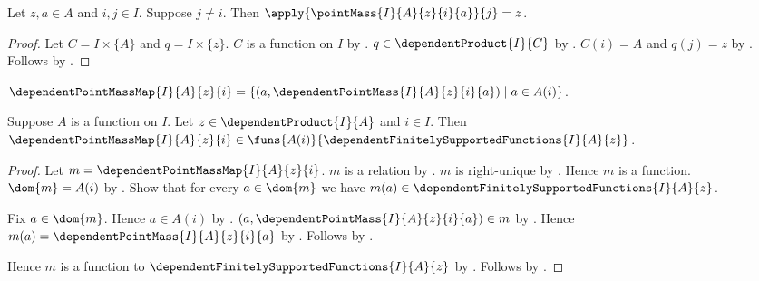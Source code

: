 \begin{proposition}\label{spike_point_mass_other}
    Let $z,a\in A$ and $i,j\in I$.
    Suppose $j\neq i$.
    Then $\apply{\pointMass{I}{A}{z}{i}{a}}{j}=z$.
\end{proposition}
\begin{proof}
    Let $C=I\times\{A\}$ and $q=I\times\{z\}$.
    $C$ is a function on $I$ by
        .
    $q\in\dependentProduct{I}{C}$ by
        .
    $C(i)=A$ and $q(j)=z$ by
        .
    Follows by
        .
\end{proof}

\begin{definition}\label{spike_dependent_point_mass_map}
    $\dependentPointMassMap{I}{A}{z}{i}
        =\{(a,\dependentPointMass{I}{A}{z}{i}{a})\mid a\in A(i)\}$.
\end{definition}

\begin{proposition}\label{spike_dependent_point_mass_map_type}
    Suppose $A$ is a function on $I$.
    Let $z\in\dependentProduct{I}{A}$ and $i\in I$.
    Then
        $\dependentPointMassMap{I}{A}{z}{i}
            \in\funs{A(i)}{
                \dependentFinitelySupportedFunctions{I}{A}{z}}$.
\end{proposition}
\begin{proof}
    Let $m=\dependentPointMassMap{I}{A}{z}{i}$.
    $m$ is a relation by
        .
    $m$ is right-unique by
        .
    Hence $m$ is a function.
    $\dom{m}=A(i)$ by
        .
    Show that for every $a\in\dom{m}$ we have
        $m(a)\in\dependentFinitelySupportedFunctions{I}{A}{z}$.
    \begin{subproof}
        Fix $a\in\dom{m}$.
        Hence $a\in A(i)$ by \auto.
        $(a,\dependentPointMass{I}{A}{z}{i}{a})\in m$ by
            .
        Hence
            $m(a)=\dependentPointMass{I}{A}{z}{i}{a}$ by
            .
        Follows by
            .
    \end{subproof}
    Hence $m$ is a function to
        $\dependentFinitelySupportedFunctions{I}{A}{z}$ by \auto.
    Follows by .
\end{proof}

